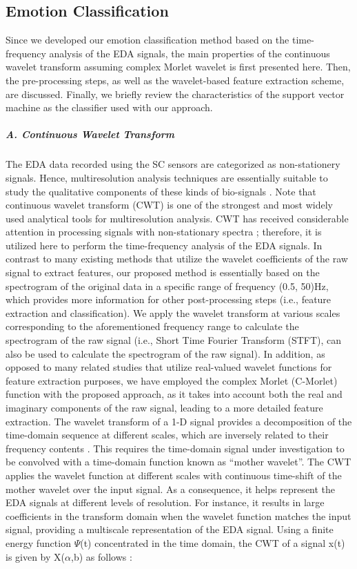 \subsection{Emotion Classification}
Since we developed our emotion classification method based on the time-frequency analysis of the
EDA signals, the main properties of the continuous wavelet transform assuming complex Morlet
wavelet is first presented here. Then, the pre-processing steps, as well as the wavelet-based
feature extraction scheme, are discussed. Finally, we briefly review the characteristics of the
support vector machine as the classifier used with our approach.\\

\subparagraph{A. Continuous Wavelet Transform}
The EDA data recorded using the SC sensors are categorized as non-stationery signals\cite{AmbulatorySys2003, EmotionalState2013}. Hence, multiresolution analysis 
techniques are essentially suitable to study the qualitative components of these 
kinds of bio-signals \cite{AmbulatorySys2003}.  Note that continuous wavelet transform 
(CWT) is one of the strongest and most widely used analytical tools for multiresolution 
analysis. CWT has received considerable attention in processing signals with 
non-stationary spectra \cite{WaveletFilter1992, SignalDecomp1989}; therefore, it is 
utilized here to perform the time-frequency analysis of the EDA signals. In contrast 
to many existing methods that utilize the wavelet coefficients of the raw signal to 
extract features, our proposed method is essentially based on the spectrogram of the 
original data in a specific range of frequency (0.5, 50)Hz, which provides more 
information for other post-processing steps (i.e., feature extraction and classification).
We apply the wavelet transform at various scales corresponding to the 
aforementioned frequency range to calculate the spectrogram of the raw signal 
(i.e., Short Time Fourier Transform (STFT), can also be used to calculate the 
spectrogram of the raw signal). In addition, as opposed to many related studies 
that utilize real-valued wavelet functions for feature extraction purposes, we have 
employed the complex Morlet (C-Morlet) function with the proposed approach, as it 
takes into account both the real and imaginary components of the raw signal, leading 
to a more detailed feature extraction.
The wavelet transform of a 1-D signal provides a decomposition of the time-domain 
sequence at different scales, which are inversely related to their frequency contents\cite{SignalDecomp1989, ContinuWavelet2009} . This requires the time-domain signal under 
investigation to be convolved with a time-domain function known as “mother wavelet”. 
The CWT applies the wavelet function at different scales with continuous time-shift 
of the mother wavelet over the input signal. As a consequence, it helps represent 
the EDA signals at different levels of resolution. For instance, it results in large 
coefficients in the transform domain when the wavelet function matches the input 
signal, providing a multiscale representation of the EDA signal.
Using a finite energy function $\Psi$(t) concentrated in the time domain, the CWT of 
a signal x(t) is given by X($\alpha$,b) as follows \cite{WaveletFilter1992}:

